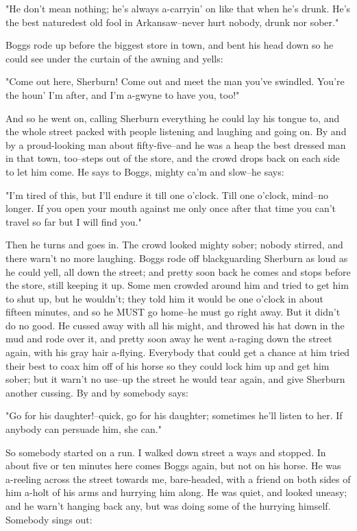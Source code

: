"He don't mean nothing; he's always a-carryin' on like that when he's
drunk.  He's the best naturedest old fool in Arkansaw--never hurt nobody,
drunk nor sober."

Boggs rode up before the biggest store in town, and bent his head down so
he could see under the curtain of the awning and yells:

"Come out here, Sherburn! Come out and meet the man you've swindled.
You're the houn' I'm after, and I'm a-gwyne to have you, too!"

And so he went on, calling Sherburn everything he could lay his tongue
to, and the whole street packed with people listening and laughing and
going on.  By and by a proud-looking man about fifty-five--and he was a
heap the best dressed man in that town, too--steps out of the store, and
the crowd drops back on each side to let him come.  He says to Boggs,
mighty ca'm and slow--he says:

"I'm tired of this, but I'll endure it till one o'clock.  Till one
o'clock, mind--no longer.  If you open your mouth against me only once
after that time you can't travel so far but I will find you."

Then he turns and goes in.  The crowd looked mighty sober; nobody
stirred, and there warn't no more laughing.  Boggs rode off blackguarding
Sherburn as loud as he could yell, all down the street; and pretty soon
back he comes and stops before the store, still keeping it up.  Some men
crowded around him and tried to get him to shut up, but he wouldn't; they
told him it would be one o'clock in about fifteen minutes, and so he MUST
go home--he must go right away.  But it didn't do no good.  He cussed
away with all his might, and throwed his hat down in the mud and rode
over it, and pretty soon away he went a-raging down the street again,
with his gray hair a-flying. Everybody that could get a chance at him
tried their best to coax him off of his horse so they could lock him up
and get him sober; but it warn't no use--up the street he would tear
again, and give Sherburn another cussing.  By and by somebody says:

"Go for his daughter!--quick, go for his daughter; sometimes he'll listen
to her.  If anybody can persuade him, she can."

So somebody started on a run.  I walked down street a ways and stopped.
In about five or ten minutes here comes Boggs again, but not on his
horse.  He was a-reeling across the street towards me, bare-headed, with
a friend on both sides of him a-holt of his arms and hurrying him along.
He was quiet, and looked uneasy; and he warn't hanging back any, but was
doing some of the hurrying himself.  Somebody sings out:

